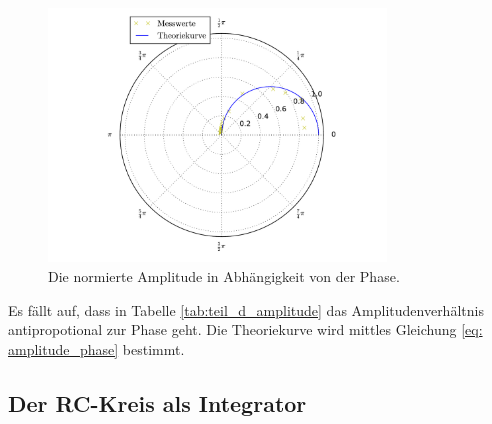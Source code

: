 \begin{figure}
  \centering
  \includegraphics[width=0.8\textwidth]{pics/polarplot.pdf}
  \caption{Die normierte Amplitude in Abhängigkeit von der Phase.}
  \label{fig:plot_teil_d}
\end{figure}

Es fällt auf, dass in Tabelle \ref{tab:teil_d_amplitude} das Amplitudenverhältnis %
antipropotional zur Phase geht. %
Die Theoriekurve wird mittles Gleichung \eqref{eq: amplitude_phase} bestimmt. %

\subsection{Der RC-Kreis als Integrator}

